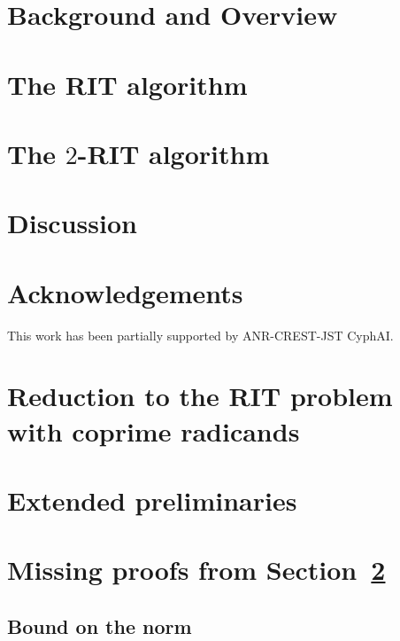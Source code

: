 \documentclass[reqno,a4paper]{amsart}
\begin{document}
\section{Background and Overview}
\label{sec:overview}



\section{The RIT algorithm}
\label{sec:conp}


\section{The $2$-RIT algorithm}
\label{sec:corp}


\section{Discussion}
\label{sec:discussion}


\SkipTocEntry\section*{Acknowledgements}
This work has been partially supported by ANR-CREST-JST CyphAI.




\appendix

\section{Reduction to the RIT problem with coprime radicands}
\label{appendix:reduction}


\section{Extended preliminaries}\label{appendix:preliminaries}


\section{Missing proofs from Section~\ref{sec:conp}}
\label{appendix:conp}

\subsection{Bound on the norm}\label{appendix:norm}

\end{document}
